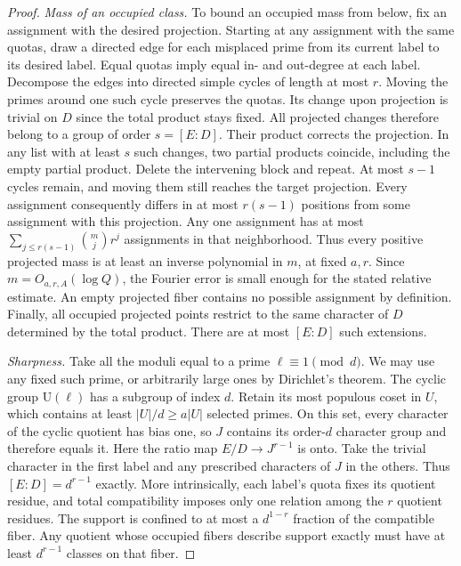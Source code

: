 \documentclass[11pt]{article}
\newcommand{\U}{\mathrm U}
\begin{document}
\begin{proof}
\smallskip\noindent\emph{Mass of an occupied class.} To bound an occupied mass from below, fix an assignment with the desired projection. Starting at any assignment with the same quotas, draw a directed edge for each misplaced prime from its current label to its desired label. Equal quotas imply equal in- and out-degree at each label. Decompose the edges into directed simple cycles of length at most $r$. Moving the primes around one such cycle preserves the quotas. Its change upon projection is trivial on $D$ since the total product stays fixed. All projected changes therefore belong to a group of order $s=[E:D]$. Their product corrects the projection. In any list with at least $s$ such changes, two partial products coincide, including the empty partial product. Delete the intervening block and repeat. At most $s-1$ cycles remain, and moving them still reaches the target projection. Every assignment consequently differs in at most $r(s-1)$ positions from some assignment with this projection. Any one assignment has at most $\sum_{j\le r(s-1)}\binom mj r^j$ assignments in that neighborhood. Thus every positive projected mass is at least an inverse polynomial in $m$, at fixed $a,r$. Since $m=O_{a,r,A}(\log Q)$, the Fourier error is small enough for the stated relative estimate. An empty projected fiber contains no possible assignment by definition. Finally, all occupied projected points restrict to the same character of $D$ determined by the total product. There are at most $[E:D]$ such extensions.

\smallskip\noindent\emph{Sharpness.} Take all the moduli equal to a prime $\ell\equiv1\pmod d$. We may use any fixed such prime, or arbitrarily large ones by Dirichlet's theorem. The cyclic group $\U(\ell)$ has a subgroup of index $d$. Retain its most populous coset in $U$, which contains at least $|U|/d\ge a|U|$ selected primes. On this set, every character of the cyclic quotient has bias one, so $J$ contains its order-$d$ character group and therefore equals it. Here the ratio map $E/D\to J^{r-1}$ is onto. Take the trivial character in the first label and any prescribed characters of $J$ in the others. Thus $[E:D]=d^{r-1}$ exactly. More intrinsically, each label's quota fixes its quotient residue, and total compatibility imposes only one relation among the $r$ quotient residues. The support is confined to at most a $d^{1-r}$ fraction of the compatible fiber. Any quotient whose occupied fibers describe support exactly must have at least $d^{r-1}$ classes on that fiber.
\end{proof}
\end{document}
